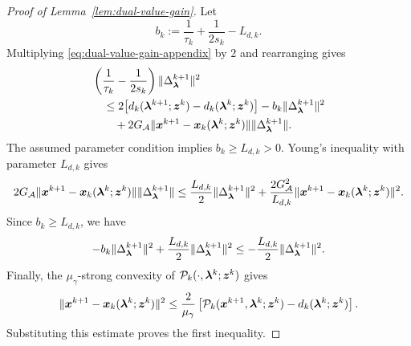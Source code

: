 \begin{proof}[Proof of Lemma~\ref{lem:dual-value-gain}]
Let
\[
    b_k:=
    \frac{1}{\tau_k}+\frac{1}{2s_k}-L_{d,k}.
\]
Multiplying \eqref{eq:dual-value-gain-appendix} by $2$ and rearranging gives
\[
\begin{aligned}
&\left(\frac{1}{\tau_k}-\frac{1}{2s_k}\right)
\|\Delta_{\bm{\lambda}}^{k+1}\|^2 \\
&\quad\le
2\bigl[d_k(\bm{\lambda}^{k+1};\bm{z}^k)-d_k(\bm{\lambda}^k;\bm{z}^k)\bigr]
-b_k\|\Delta_{\bm{\lambda}}^{k+1}\|^2 \\
&\qquad+
2G_{\cal A}\|\bm{x}^{k+1}-\bm{x}_k(\bm{\lambda}^k;\bm{z}^k)\|
\|\Delta_{\bm{\lambda}}^{k+1}\|.
\end{aligned}
\]
The assumed parameter condition implies $b_k\ge L_{d,k}>0$. Young's inequality
with parameter $L_{d,k}$ gives
\[
2G_{\cal A}\|\bm{x}^{k+1}-\bm{x}_k(\bm{\lambda}^k;\bm{z}^k)\|
\|\Delta_{\bm{\lambda}}^{k+1}\|
\le
\frac{L_{d,k}}{2}\|\Delta_{\bm{\lambda}}^{k+1}\|^2
+\frac{2G_{\cal A}^2}{L_{d,k}}
\|\bm{x}^{k+1}-\bm{x}_k(\bm{\lambda}^k;\bm{z}^k)\|^2.
\]
Since $b_k\ge L_{d,k}$, we have
\[
    -b_k\|\Delta_{\bm{\lambda}}^{k+1}\|^2
    +\frac{L_{d,k}}{2}\|\Delta_{\bm{\lambda}}^{k+1}\|^2
    \le
    -\frac{L_{d,k}}{2}\|\Delta_{\bm{\lambda}}^{k+1}\|^2.
\]
Finally, the $\mu_\gamma$-strong convexity of
$\mathcal P_k(\cdot,\bm{\lambda}^k;\bm{z}^k)$ gives
\[
\|\bm{x}^{k+1}-\bm{x}_k(\bm{\lambda}^k;\bm{z}^k)\|^2
\le
\frac{2}{\mu_\gamma}
\left[
\mathcal P_k(\bm{x}^{k+1},\bm{\lambda}^k;\bm{z}^k)
-d_k(\bm{\lambda}^k;\bm{z}^k)
\right].
\]
Substituting this estimate proves the first inequality.
\end{proof}

